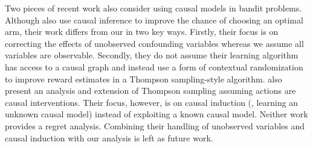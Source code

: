 Two pieces of recent work also consider using causal models in bandit problems.
Although \citet{Bareinboim2015} also use causal inference to improve the chance of choosing an optimal arm, their work differs from our in two key ways. Firstly, their focus is on correcting the effects of unobserved confounding variables whereas we assume all variables are observable. Secondly, they do not assume their learning algorithm has access to a causal graph and instead use a form of contextual randomization to improve reward estimates in a Thompson sampling-style algorithm. \citet{Ortega2014} also present an analysis and extension of Thompson sampling assuming actions are causal interventions. Their focus, however, is on causal induction (\ie, learning an unknown causal model) instead of exploiting a known causal model. Neither work provides a regret analysis. 
Combining their handling of unobserved variables and causal induction with our analysis is left as future work.


